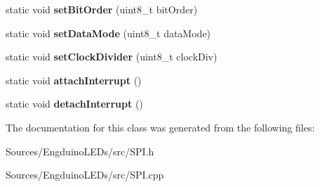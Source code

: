 \begin{DoxyCompactItemize}
\item 
\hypertarget{class_s_p_i_class_a89d65229b73a3e5d846c9b538e988f97}{}static void {\bfseries set\+Bit\+Order} (uint8\+\_\+t bit\+Order)\label{class_s_p_i_class_a89d65229b73a3e5d846c9b538e988f97}

\item 
\hypertarget{class_s_p_i_class_adc36dd3465da6f3c7cfc05c08c066b38}{}static void {\bfseries set\+Data\+Mode} (uint8\+\_\+t data\+Mode)\label{class_s_p_i_class_adc36dd3465da6f3c7cfc05c08c066b38}

\item 
\hypertarget{class_s_p_i_class_a472cba5159ed3f74b2a43a4cc3781824}{}static void {\bfseries set\+Clock\+Divider} (uint8\+\_\+t clock\+Div)\label{class_s_p_i_class_a472cba5159ed3f74b2a43a4cc3781824}

\item 
\hypertarget{class_s_p_i_class_afbdbcf7f1360c567aabd7afa8905fb69}{}static void {\bfseries attach\+Interrupt} ()\label{class_s_p_i_class_afbdbcf7f1360c567aabd7afa8905fb69}

\item 
\hypertarget{class_s_p_i_class_a4a5eec76f907eef2b8d40fc4a3032327}{}static void {\bfseries detach\+Interrupt} ()\label{class_s_p_i_class_a4a5eec76f907eef2b8d40fc4a3032327}

\end{DoxyCompactItemize}


The documentation for this class was generated from the following files\+:\begin{DoxyCompactItemize}
\item 
Sources/\+Engduino\+L\+E\+Ds/src/S\+P\+I.\+h\item 
Sources/\+Engduino\+L\+E\+Ds/src/S\+P\+I.\+cpp\end{DoxyCompactItemize}
